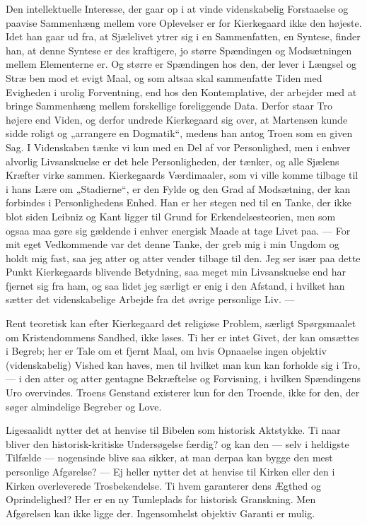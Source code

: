 \documentclass[12pt,a4paper,openany]{book}
\newcommand{\opage}[1]{\marginnote{\footnotesize\textit{[#1]}}}
\begin{document}
Den intellektuelle Interesse, der gaar op i at vinde videnskabelig Forstaaelse
og paavise Sammenhæng mellem vore Oplevelser er for Kierkegaard ikke den
højeste. Idet han gaar ud fra, at Sjælelivet ytrer sig i en Sammenfatten, en
Syntese, finder han, at denne Syntese er des kraftigere, jo større Spændingen
og Modsætningen mellem Elementerne er. Og større er Spændingen hos den, der
lever i Længsel og Stræ%
\setcounter{footnote}{0}%
\opage{154}ben mod et evigt Maal, og som altsaa skal sammenfatte Tiden med
Evigheden i urolig Forventning, end hos den Kontemplative, der arbejder med at
bringe Sammenhæng mellem forskellige foreliggende Data. Derfor staar Tro højere
end Viden, og derfor undrede Kierkegaard sig over, at Martensen kunde sidde
roligt og „arrangere en Dogmatik“, medens han antog Troen som en given Sag. I
Videnskaben tænke vi kun med en Del af vor Personlighed, men i enhver alvorlig
Livsanskuelse er det hele Personligheden, der tænker, og alle Sjælens Kræfter
virke sammen. Kierkegaards Værdimaaler, som vi ville komme tilbage til i hans
Lære om „Stadierne“, er den Fylde og den Grad af Modsætning, der kan forbindes
i Personlighedens Enhed. Han er her stegen ned til en Tanke, der ikke blot
siden Leibniz og Kant ligger til Grund for Erkendelsesteorien, men som ogsaa
maa gøre sig gældende i enhver energisk Maade at tage Livet paa. --- For mit
eget Vedkommende var det denne Tanke, der greb mig i min Ungdom og holdt mig
fast, saa jeg atter og atter vender tilbage til den. Jeg ser især paa dette
Punkt Kierkegaards blivende Betydning, saa meget min Livsanskuelse end har
fjernet sig fra ham, og saa lidet jeg særligt er enig i den Afstand, i hvilket
han sætter det videnskabelige Arbejde fra det øvrige personlige Liv. ---

Rent teoretisk kan efter Kierkegaard det religiøse Problem, særligt
Spørgsmaalet om Kristendommens Sandhed, ikke løses. Ti her er intet Givet, der
kan omsættes i Begreb; her er Tale om et fjernt Maal, om hvis Opnaaelse ingen
objektiv (videnskabelig) Vished kan haves, men til hvilket man kun kan forholde
sig i Tro, --- i den atter og atter gentagne Bekræftelse og Forvisning, i
hvilken Spændingens Uro overvindes. Troens Genstand existerer kun for den
Troende, ikke for den, der søger almindelige Begreber og Love.

Ligesaalidt nytter det at henvise til Bibelen som historisk Aktstykke. Ti naar
bliver den historisk-kritiske Undersøgelse færdig? og kan den --- selv i
heldigste Tilfælde --- nogensinde blive saa sikker, at man derpaa kan bygge den
mest personlige Afgørelse? --- Ej heller nytter det at henvise til Kirken
\setcounter{footnote}{0}%
\opage{155}eller den i Kirken overleverede Trosbekendelse. Ti hvem garanterer
dens Ægthed og Oprindelighed? Her er en ny Tumleplads for historisk Granskning.
Men Afgørelsen kan ikke ligge der. Ingensomhelst objektiv Garanti er mulig.
\end{document}
